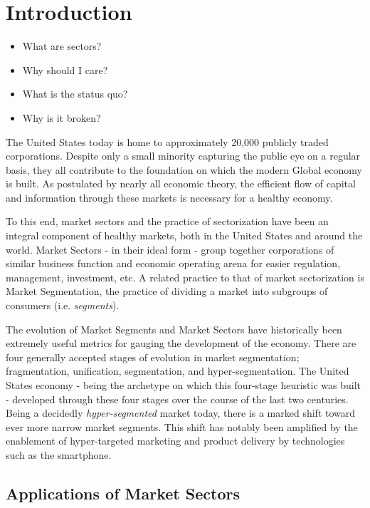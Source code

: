 \documentclass[../main.tex]{subfiles}
\begin{document}
    
\chapter{Introduction}
    
\begin{itemize}
    \item What are sectors?
    \item Why should I care?
    \item What is the status quo?
    \item Why is it broken?
\end{itemize}

The United States today is home to approximately 20,000 publicly traded corporations. Despite only a small minority capturing the public eye on a regular basis, they all contribute to the foundation on which the modern Global economy is built. As postulated by nearly all economic theory, the efficient flow of capital and information through these markets is necessary for a healthy economy.

To this end, market sectors and the practice of sectorization have been an integral component of healthy markets, both in the United States and around the world. Market Sectors - in their ideal form - group together corporations of similar business function and economic operating arena for easier regulation, management, investment, etc. A related practice to that of market sectorization is Market Segmentation, the practice of dividing a market into subgroups of consumers (i.e. \textit{segments}).

The evolution of Market Segments and Market Sectors have historically been extremely useful metrics for gauging the development of the economy. There are four generally accepted stages of evolution in market segmentation; fragmentation, unification, segmentation, and hyper-segmentation. The United States economy - being the archetype on which this four-stage heuristic was built - developed through these four stages over the course of the last two centuries. Being a decidedly \textit{hyper-segmented} market today, there is a marked shift toward ever more narrow market segments. This shift has notably been amplified by the enablement of hyper-targeted marketing and product delivery by technologies such as the smartphone.

\section{Applications of Market Sectors}
\end{document}
